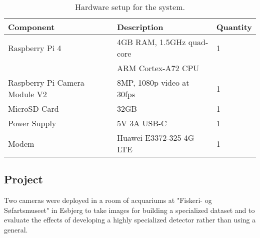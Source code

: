 \begin{table}[H]
    \centering\renewcommand{\arraystretch}{1.5} %
    \setlength{\tabcolsep}{1em}
    \begin{tabular}{|l|l|l|}
        \hline
        \rowcolor{gray!25}
        \textbf{Component} & \textbf{Description} & \textbf{Quantity} \\
        \hline
        Raspberry Pi 4 & 4GB RAM, 1.5GHz quad-core & 1\\ 
                    & ARM Cortex-A72 CPU & \\ \hline
        Raspberry Pi Camera Module V2 & 8MP, 1080p video at 30fps & 1 \\ \hline
        MicroSD Card & 32GB & 1 \\ \hline
        Power Supply & 5V 3A USB-C & 1 \\ \hline
        Modem & Huawei E3372-325 4G LTE & 1 \\ \hline
    \end{tabular}
    \caption{Hardware setup for the system.}
    \label{tab:hardware_setup}
\end{table}

\subsection{Project}
Two cameras were deployed in a room of acquariums at "Fiskeri- og Søfartsmuseet" in Esbjerg to take images for building a specialized dataset and to evaluate the effects of developing a highly specialized detector rather than using a general.

